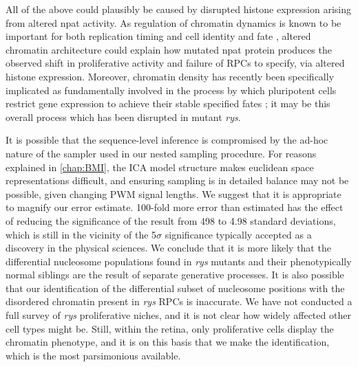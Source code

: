 All of the above could plausibly be caused by disrupted histone expression arising from altered npat activity. As regulation of chromatin dynamics is known to be important for both replication timing \cite{Gilbert2010} and cell identity and fate \cite{Serrano2013}, altered chromatin architecture could explain how mutated npat protein produces the observed shift in proliferative activity and failure of RPCs to specify, via altered histone expression. Moreover, chromatin density has recently been specifically implicated as fundamentally involved in the process by which pluripotent cells restrict gene expression to achieve their stable specified fates \cite{Golkaram2017}; it may be this overall process which has been disrupted in mutant \textit{rys}.

It is possible that the sequence-level inference is compromised by the ad-hoc nature of the sampler used in our nested sampling procedure. For reasons explained in \autoref{chap:BMI}, the ICA model structure makes euclidean space representations difficult, and ensuring sampling is in detailed balance may not be possible, given changing PWM signal lengths. We suggest that it is appropriate to magnify our error estimate. 100-fold more error than estimated has the effect of reducing the significance of the result from 498 to 4.98 standard deviations, which is still in the vicinity of the 5$\sigma$ significance typically accepted as a discovery in the physical sciences. We conclude that it is more likely that the differential nucleosome populations found in \textit{rys} mutants and their phenotypically normal siblings are the result of separate generative processes. It is also possible that our identification of the differential subset of nucleosome positions with the disordered chromatin present in \textit{rys} RPCs is inaccurate. We have not conducted a full survey of \textit{rys} proliferative niches, and it is not clear how widely affected other cell types might be. Still, within the retina, only proliferative cells display the chromatin phenotype, and it is on this basis that we make the identification, which is the most parsimonious available. 

